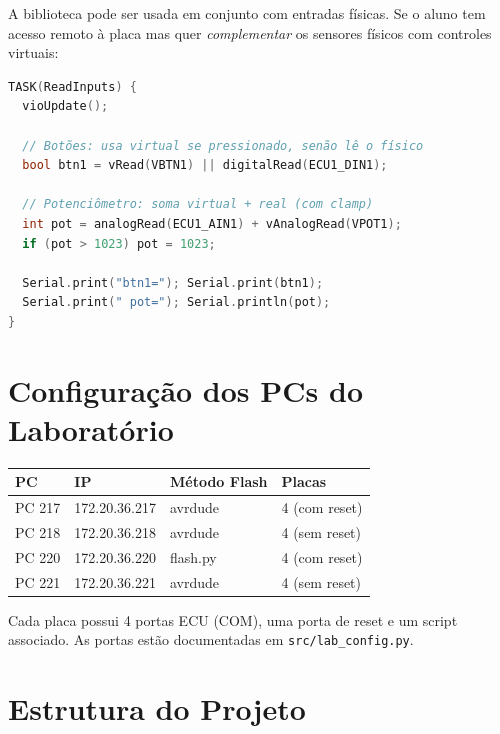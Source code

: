 \documentclass[12pt,a4paper]{article}
\begin{document}
A biblioteca pode ser usada em conjunto com entradas físicas. Se o aluno tem acesso remoto à placa mas quer \emph{complementar} os sensores físicos com controles virtuais:

\begin{lstlisting}[language=C++,caption={Leitura mista: virtual + real}]
TASK(ReadInputs) {
  vioUpdate();

  // Botões: usa virtual se pressionado, senão lê o físico
  bool btn1 = vRead(VBTN1) || digitalRead(ECU1_DIN1);

  // Potenciômetro: soma virtual + real (com clamp)
  int pot = analogRead(ECU1_AIN1) + vAnalogRead(VPOT1);
  if (pot > 1023) pot = 1023;

  Serial.print("btn1="); Serial.print(btn1);
  Serial.print(" pot="); Serial.println(pot);
}
\end{lstlisting}

\section{Configuração dos PCs do Laboratório}

\begin{center}
\begin{tabular}{llll}
  \toprule
  \textbf{PC} & \textbf{IP} & \textbf{Método Flash} & \textbf{Placas} \\
  \midrule
  PC 217 & 172.20.36.217 & avrdude  & 4 (com reset) \\
  PC 218 & 172.20.36.218 & avrdude  & 4 (sem reset) \\
  PC 220 & 172.20.36.220 & flash.py & 4 (com reset) \\
  PC 221 & 172.20.36.221 & avrdude  & 4 (sem reset) \\
  \bottomrule
\end{tabular}
\end{center}

Cada placa possui 4 portas ECU (COM), uma porta de reset e um script associado. As portas estão documentadas em \texttt{src/lab\_config.py}.

\section{Estrutura do Projeto}
\end{document}
